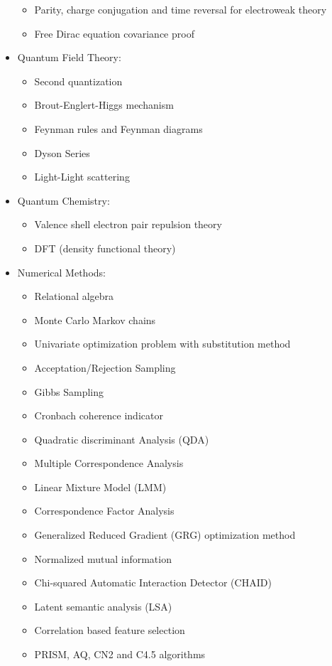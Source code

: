 \begin{itemize}
\begin{itemize}
				\item Parity, charge conjugation and time reversal for electroweak theory
				\item Free Dirac equation covariance proof
			\end{itemize}
		\item Quantum Field Theory:
			\begin{itemize}
				\item Second quantization
				\item Brout-Englert-Higgs mechanism
				\item Feynman rules and Feynman diagrams
				\item Dyson Series
				\item Light-Light scattering
			\end{itemize}
		\item Quantum Chemistry:
			\begin{itemize}
				\item Valence shell electron pair repulsion theory
				\item DFT (density functional theory)
			\end{itemize}
		\item Numerical Methods: 
			\begin{itemize}
				\item Relational algebra	
				\item Monte Carlo Markov chains			
				\item Univariate optimization problem with substitution method		
				\item Acceptation/Rejection Sampling
				\item Gibbs Sampling
				\item Cronbach coherence indicator
				\item Quadratic discriminant Analysis (QDA)
				\item Multiple Correspondence Analysis
				\item Linear Mixture Model (LMM)
				\item Correspondence Factor Analysis
				\item Generalized Reduced Gradient (GRG) optimization method
				\item Normalized mutual information
				\item Chi-squared Automatic Interaction Detector (CHAID)
				\item Latent semantic analysis (LSA)
				\item Correlation based feature selection
				\item PRISM, AQ, CN2 and C4.5 algorithms

\end{itemize}
\end{itemize}
